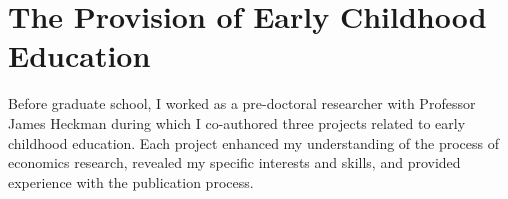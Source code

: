 




\section{The Provision of Early Childhood Education}

Before graduate school, I worked as a pre-doctoral researcher with Professor James Heckman during which I co-authored three projects related to early childhood education. Each project enhanced my understanding of the process of economics research, revealed my specific interests and skills, and provided experience with the publication process. 


